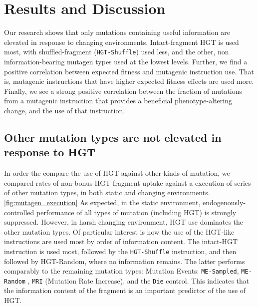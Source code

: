 \documentclass[PhD]{msu-thesis}
\begin{document}
\section{Results and Discussion}
Our research shows that only mutations containing useful information are elevated in response to changing environments. Intact-fragment HGT is used most, with shuffled-fragment (\texttt{HGT-Shuffle}) used less, and the other, non information-bearing mutagen types used at the lowest levels.  Further, we find a positive correlation between expected fitness and mutagenic instruction use. That is, mutagenic instructions that have higher expected fitness effects are used more. Finally, we see a strong positive correlation between the fraction of mutations from a mutagenic instruction that provides a beneficial phenotype-altering change, and the use of that instruction.

\subsection{Other mutation types are not elevated in response to HGT}
In order the compare the use of HGT against other kinds of mutation, we compared rates of non-bonus HGT fragment uptake against a execution of series of other mutation types, in both static and changing environments.\ref{fig:mutagen_execution} As expected, in the static environment, endogenously-controlled performance of all types of mutation (including HGT) is strongly suppressed. However, in harsh changing environment, HGT use dominates the other mutation types. Of particular interest is how the use of the HGT-like instructions are used most by order of information content. The intact-HGT instruction is used most, followed by the \texttt{HGT-Shuffle} instruction, and then followed by {HGT-Random}, where no information remains.
The latter performs comparably to the remaining mutation types: Mutation Events: \texttt{ME-Sampled}, \texttt{ME-Random}
, \texttt{MRI} (Mutation Rate Increase), and the \texttt{Die} control. This indicates that the information content of the fragment is an important predictor of the use of HGT. 
\end{document}
